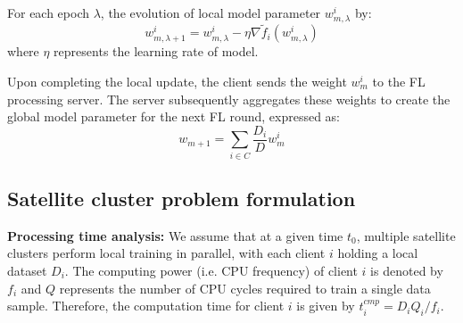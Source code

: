 For each epoch $\lambda$, the evolution of local model parameter \(w_{m,\lambda}^{i}\) by:
\begin{equation}
w_{m,\lambda+1}^{i} = w_{m,\lambda}^{i} - \eta \nabla \tilde{f}_i(w_{m,\lambda}^{i})
\label{eq:evo}
\end{equation}
where $\eta$ represents the learning rate of model. 

\begin{comment}
and the local gradient is defined as:
\begin{equation}
 \nabla \tilde{f}_i(x_{t,\tau}^i) = \nabla L(x_{t,\tau}^i; \Lambda_{t,\tau}^i)   
\end{equation}
\end{comment}

Upon completing the local update, the client sends the weight $w_m^i$ to the FL processing server. The server subsequently aggregates these weights to create the global model parameter for the next FL round, expressed as:
\begin{equation}
w_{m+1} =  \sum_{i \in C} \frac{D_i}{D} w_m^i
\end{equation}

\subsection{Satellite cluster problem formulation}

\textbf{Processing time analysis:} We assume that at a given time $t_0$, multiple satellite clusters perform local training in parallel, with each client $i$ holding a local dataset  $D_i$. The computing power (i.e. CPU frequency) of client $i$ is denoted by $f_i$ and $Q$  represents the number of CPU cycles required to train a single data sample. Therefore, the computation time for client $i$ is given by $t_{i}^{cmp}= {D_i Q_i}/{f_i}$.
\begin{comment}
\begin{equation}
t_{i}^{cmp}= \frac{D_i Q_i}{f_i}
\end{equation}
\end{comment}

